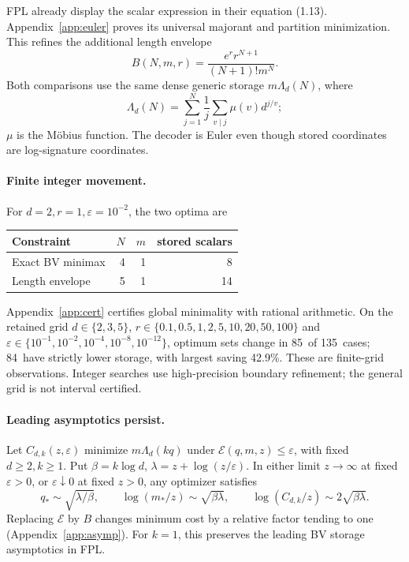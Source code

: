 \documentclass[11pt,a4paper]{article}
\newcommand{\E}{\mathcal E}
\newcommand{\GridCases}{135}
\newcommand{\GridMoved}{85}
\newcommand{\GridCheaper}{84}
\newcommand{\GridSaving}{42.9}
\begin{document}
FPL already display the scalar expression in their equation (1.13).
Appendix~\ref{app:euler} proves its universal majorant and partition
minimization. This refines the additional length envelope
\[
 B(N,m,r)=\frac{e^r r^{N+1}}{(N+1)!m^N}.
\]
Both comparisons use the same dense generic storage \(m\Lambda_d(N)\), where
\[
 \Lambda_d(N)=\sum_{j=1}^N\frac1j\sum_{v\mid j}\mu(v)d^{j/v};
\]
\(\mu\) is the M\"obius function. The decoder is Euler even though stored
coordinates are log-signature coordinates.

\paragraph{Finite integer movement.}
For \(d=2,r=1,\varepsilon=10^{-2}\), the two optima are
\begin{center}
\begin{tabular}{lrrr}
\toprule
Constraint & \(N\) & \(m\) & stored scalars\\
\midrule
Exact BV minimax & 4 & 1 & 8\\
Length envelope & 5 & 1 & 14\\
\bottomrule
\end{tabular}
\end{center}
Appendix~\ref{app:cert} certifies global minimality with rational arithmetic.
On the retained grid \(d\in\{2,3,5\}\),
\(r\in\{0.1,0.5,1,2,5,10,20,50,100\}\) and
\(\varepsilon\in\{10^{-1},10^{-2},10^{-4},10^{-8},10^{-12}\}\),
optimum sets change in \GridMoved\ of \GridCases\ cases;
\GridCheaper\ have strictly lower storage, with largest saving \GridSaving\%.
These are finite-grid observations. Integer searches use high-precision
boundary refinement; the general grid is not interval certified.

\paragraph{Leading asymptotics persist.}
Let \(C_{d,k}(z,\varepsilon)\) minimize \(m\Lambda_d(kq)\) under
\(\E(q,m,z)\le\varepsilon\), with fixed \(d\ge2,k\ge1\).
Put \(\beta=k\log d\), \(\lambda=z+\log(z/\varepsilon)\).
In either limit \(z\to\infty\) at fixed \(\varepsilon>0\), or
\(\varepsilon\downarrow0\) at fixed \(z>0\), any optimizer satisfies
\begin{equation}\label{eq:asymp}
 q_*\sim\sqrt{\lambda/\beta},\qquad
 \log(m_*/z)\sim\sqrt{\beta\lambda},\qquad
 \log(C_{d,k}/z)\sim2\sqrt{\beta\lambda}.
\end{equation}
Replacing \(\E\) by \(B\) changes minimum cost by a relative factor tending
to one (Appendix~\ref{app:asymp}). For \(k=1\), this preserves the leading BV
storage asymptotics in FPL.
\end{document}
